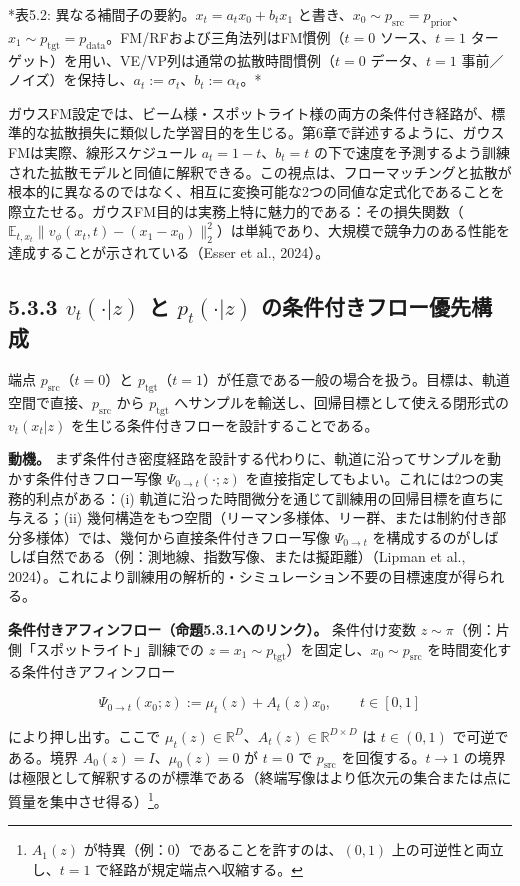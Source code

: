 *表5.2: 異なる補間子の要約。$x_t=a_t x_0+b_t x_1$ と書き、$x_0\sim p_{\mathrm{src}}=p_{\mathrm{prior}}$、$x_1\sim p_{\mathrm{tgt}}=p_{\mathrm{data}}$。FM/RFおよび三角法列はFM慣例（$t=0$ ソース、$t=1$ ターゲット）を用い、VE/VP列は通常の拡散時間慣例（$t=0$ データ、$t=1$ 事前／ノイズ）を保持し、$a_t:=\sigma_t$、$b_t:=\alpha_t$。*

ガウスFM設定では、ビーム様・スポットライト様の両方の条件付き経路が、標準的な拡散損失に類似した学習目的を生じる。第6章で詳述するように、ガウスFMは実際、線形スケジュール $a_t=1-t$、$b_t=t$ の下で速度を予測するよう訓練された拡散モデルと同値に解釈できる。この視点は、フローマッチングと拡散が根本的に異なるのではなく、相互に変換可能な2つの同値な定式化であることを際立たせる。ガウスFM目的は実務上特に魅力的である：その損失関数（$\mathbb{E}_{t,x_t}\|v_\phi(x_t,t)-(x_1-x_0)\|_2^2$）は単純であり、大規模で競争力のある性能を達成することが示されている（Esser et al., 2024）。

\subsection*{5.3.3 $v_t(\cdot|z)$ と $p_t(\cdot|z)$ の条件付きフロー優先構成}


端点 $p_{\mathrm{src}}$（$t=0$）と $p_{\mathrm{tgt}}$（$t=1$）が任意である一般の場合を扱う。目標は、軌道空間で直接、$p_{\mathrm{src}}$ から $p_{\mathrm{tgt}}$ へサンプルを輸送し、回帰目標として使える閉形式の $v_t(x_t|z)$ を生じる条件付きフローを設計することである。

\textbf{動機。} まず条件付き密度経路を設計する代わりに、軌道に沿ってサンプルを動かす条件付きフロー写像 $\Psi_{0\to t}(\cdot;z)$ を直接指定してもよい。これには2つの実務的利点がある：(i) 軌道に沿った時間微分を通じて訓練用の回帰目標を直ちに与える；(ii) 幾何構造をもつ空間（リーマン多様体、リー群、または制約付き部分多様体）では、幾何から直接条件付きフロー写像 $\Psi_{0\to t}$ を構成するのがしばしば自然である（例：測地線、指数写像、または擬距離）（Lipman et al., 2024）。これにより訓練用の解析的・シミュレーション不要の目標速度が得られる。

\textbf{条件付きアフィンフロー（命題5.3.1へのリンク）。} 条件付け変数 $z\sim\pi$（例：片側「スポットライト」訓練での $z=x_1\sim p_{\mathrm{tgt}}$）を固定し、$x_0\sim p_{\mathrm{src}}$ を時間変化する条件付きアフィンフロー

\[
\Psi_{0\to t}(x_0;z):=\mu_t(z)+A_t(z)x_0,\qquad t\in[0,1]
\]


により押し出す。ここで $\mu_t(z)\in\mathbb{R}^D$、$A_t(z)\in\mathbb{R}^{D\times D}$ は $t\in(0,1)$ で可逆である。境界 $A_0(z)=I$、$\mu_0(z)=0$ が $t=0$ で $p_{\mathrm{src}}$ を回復する。$t\to 1$ の境界は極限として解釈するのが標準である（終端写像はより低次元の集合または点に質量を集中させ得る）\footnote{$A_1(z)$ が特異（例：$0$）であることを許すのは、$(0,1)$ 上の可逆性と両立し、$t=1$ で経路が規定端点へ収縮する。}。


